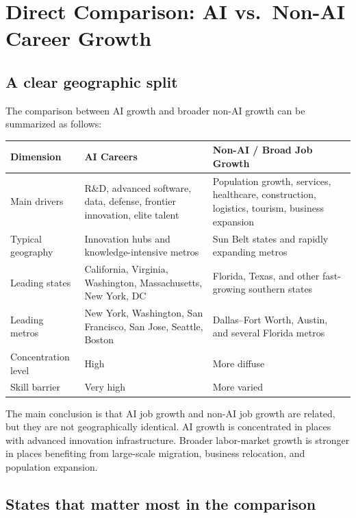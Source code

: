 \documentclass[12pt,a4paper]{article}
\begin{document}
\section{Direct Comparison: AI vs.\ Non-AI Career Growth}

\subsection{A clear geographic split}

The comparison between AI growth and broader non-AI growth can be summarized as follows:

\begin{center}
\begin{tabular}{p{}p{}p{}}
\toprule
\textbf{Dimension} & \textbf{AI Careers} & \textbf{Non-AI / Broad Job Growth} \\
\midrule
Main drivers & R\&D, advanced software, data, defense, frontier innovation, elite talent & Population growth, services, healthcare, construction, logistics, tourism, business expansion \\
Typical geography & Innovation hubs and knowledge-intensive metros & Sun Belt states and rapidly expanding metros \\
Leading states & California, Virginia, Washington, Massachusetts, New York, DC & Florida, Texas, and other fast-growing southern states \\
Leading metros & New York, Washington, San Francisco, San Jose, Seattle, Boston & Dallas--Fort Worth, Austin, and several Florida metros \\
Concentration level & High & More diffuse \\
Skill barrier & Very high & More varied \\
\bottomrule
\end{tabular}
\end{center}

The main conclusion is that AI job growth and non-AI job growth are related, but they are not geographically identical. AI growth is concentrated in places with advanced innovation infrastructure. Broader labor-market growth is stronger in places benefiting from large-scale migration, business relocation, and population expansion.

\subsection{States that matter most in the comparison}
\end{document}
